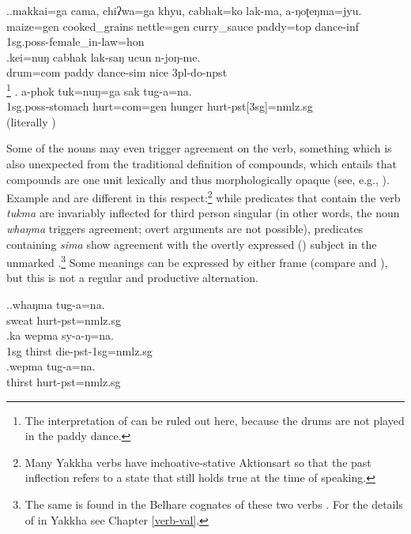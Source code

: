 \ex.\ag.makkai=ga cama, chiʔwa=ga    khyu,   cabhak=ko  lak-ma, a-ŋoʈeŋma=jyu.\\
maize{\sc =gen} cooked\_grains nettle{\sc =gen} curry\_sauce paddy{\sc =top} dance{\sc -inf} {\sc 1sg.poss-}female\_in-law{\sc =hon}\\
 
\bg.kei=nuŋ cabhak lak-saŋ ucun n-joŋ-me.\\
drum{\sc =com} paddy dance{\sc -sim} nice {\sc 3pl-}do{\sc -npst}\\
\footnote{The interpretation of  can be ruled out here, because the drums are not played in the paddy dance.} 
	\bg. a-phok tuk=nuŋ=ga  sak tug-a=na.\\
	{\sc 1sg.poss}-stomach hurt{\sc =com=gen} hunger hurt{\sc -pst[3sg]=nmlz.sg}	\\
	 (literally ) 

	
Some of the nouns may even trigger agreement on the verb, something which is also unexpected from the traditional definition of compounds, which entails that compounds are one unit lexically and thus morphologically opaque  (see, e.g., \citealt{Fabb2001Compounding}). Example \Next[a] and \Next[b] are different in this respect:\footnote{Many Yakkha verbs have inchoative-stative Aktionsart so that the past inflection refers to a state that still holds true at the time of speaking.} while predicates that contain the verb \emph{tukma}  are invariably inflected for third person singular (in other words, the noun \emph{whaŋma} triggers agreement; overt arguments are not possible), predicates containing \emph{sima}   show agreement with the overtly expressed () subject in the unmarked  \Next[b].\footnote{The same  is found in the Belhare cognates of these two verbs \citep{Bickel1997The-possessive}. For the details of  in Yakkha see Chapter \ref{verb-val}.} Some meanings can be expressed by either frame (compare \Next[b] and \Next[c]), but this is not a regular and productive alternation.
  
\ex.\ag.whaŋma tug-a=na.\\
sweat hurt{\sc [3sg]-pst=nmlz.sg}\\
\bg.ka wepma sy-a-ŋ=na.\\
{\sc 1sg} thirst die{\sc -pst-1sg=nmlz.sg}\\
\bg.wepma tug-a=na.\\
thirst hurt{\sc [3sg]-pst=nmlz.sg}\\

